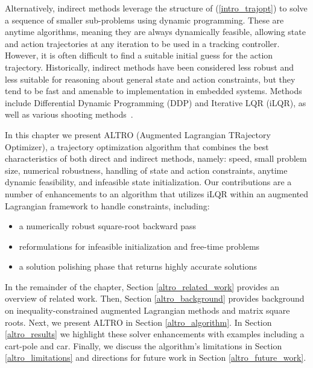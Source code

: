 Alternatively, indirect methods leverage the structure of (\ref{intro_trajopt}) to solve a sequence of smaller sub-problems using dynamic programming. These are anytime algorithms, meaning they are always dynamically feasible, allowing state and action trajectories at any iteration to be used in a tracking controller. However, it is often difficult to find a suitable initial guess for the action trajectory. Historically, indirect methods have been considered less robust and less suitable for reasoning about general state and action constraints, but they tend to be fast and amenable to implementation in embedded systems. Methods include Differential Dynamic Programming (DDP) \cite{mayne1966second} and Iterative LQR (iLQR)\cite{li2004iterative}, as well as various shooting methods~\cite{keller2018numerical}. 

In this chapter we present ALTRO (Augmented Lagrangian TRajectory Optimizer), a trajectory optimization algorithm that combines the best characteristics of both direct and indirect methods, namely: speed, small problem size, numerical robustness, handling of state and action constraints, anytime dynamic feasibility, and infeasible state initialization. Our contributions are a number of enhancements to an algorithm that utilizes iLQR within an augmented Lagrangian framework to handle constraints, including:
\begin{itemize}
	\item a numerically robust square-root backward pass
	\item reformulations for infeasible initialization and free-time problems
	\item a solution polishing phase that returns highly accurate solutions
\end{itemize} 

In the remainder of the chapter, Section \ref{altro_related_work} provides an overview of related work. Then, Section \ref{altro_background} provides background on inequality-constrained augmented Lagrangian methods and matrix square roots. Next, we present ALTRO in Section \ref{altro_algorithm}. In Section \ref{altro_results} we highlight these solver enhancements with examples including a cart-pole and car. Finally, we discuss the algorithm's limitations in Section \ref{altro_limitations} and directions for future work in Section \ref{altro_future_work}.

